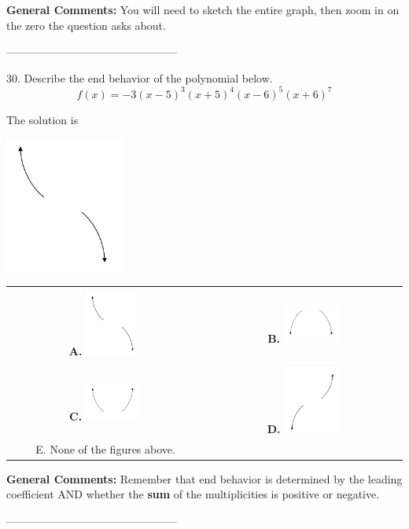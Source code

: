 \documentclass{article}[14pt]
\begin{document}
\textbf{General Comments:} You will need to sketch the entire graph, then zoom in on the zero the question asks about.

-----------------------------------------------

30. Describe the end behavior of the polynomial below.
$$ f(x) = -3(x - 5)^{3}(x + 5)^{4}(x - 6)^{5}(x + 6)^{7} $$ 

 
 The solution is  
 \begin{center} \includegraphics[width=0.3\textwidth]{../Figures/endBehaviorNegativeOddA.png} \end{center}\begin{tabular}{|c|c|} 
\hline 
 & \tabularnewline 
 \textbf{A.} \includegraphics[width=0.3\textwidth]{../Figures/endBehaviorNegativeOddA.png} & \textbf{B.} \includegraphics[width=0.3\textwidth]{../Figures/endBehaviorNegativeEvenA.png} \tabularnewline 
\hline 
 & \tabularnewline 
 \textbf{C.} \includegraphics[width=0.3\textwidth]{../Figures/endBehaviorPositiveEvenA.png} & \textbf{D.} \includegraphics[width=0.3\textwidth]{../Figures/endBehaviorPositiveOddA.png} \tabularnewline 
\hline 
 E. None of the figures above. & \tabularnewline 
\hline 
 \end{tabular} 
 
\textbf{General Comments:} Remember that end behavior is determined by the leading coefficient AND whether the \textbf{sum} of the multiplicities is positive or negative.

-----------------------------------------------
\end{document}
